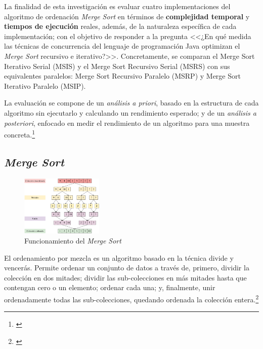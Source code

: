 \documentclass[titlepage]{article}
\begin{document}
La finalidad de esta investigación es evaluar cuatro implementaciones del algoritmo de ordenación \textit{Merge Sort} en términos de \textbf{complejidad temporal} y \textbf{tiempos de ejecución} reales, además, de la naturaleza específica de cada implementación; con el objetivo de responder a la pregunta <<¿En qué medida las técnicas de concurrencia del lenguaje de programación Java optimizan el \textit{Merge Sort} recursivo e iterativo?>>. Concretamente, se comparan el Merge Sort Iterativo Serial (MSIS) y el Merge Sort Recursivo Serial (MSRS) con sus equivalentes paralelos: Merge Sort Recursivo Paralelo (MSRP) y Merge Sort Iterativo Paralelo (MSIP).

La evaluación se compone de un \textit{análisis a priori}, basado en la estructura de cada algoritmo sin ejecutarlo y calculando un rendimiento esperado; y de un \textit{análisis a posteriori}, enfocado en medir el rendimiento de un algoritmo para una muestra concreta.\footnote{\cite{shoolini2025}}

\subsection{\textit{Merge Sort}} %

\begin{figure}
	\vspace{-10pt}
	\centering
	\includegraphics[width=0.35\textwidth]{Diagrames/arbolMS.png}
	\captionsetup{justification=centering}
	\caption{Funcionamiento del \textit{Merge Sort}}
	\label{fig:arbolMS2}
\end{figure}
El ordenamiento por mezcla es un algoritmo basado en la técnica divide y vencerás. Permite ordenar un conjunto de datos a través de, primero, dividir la colección en dos mitades; dividir las sub-colecciones en más mitades hasta que contengan cero o un elemento; ordenar cada una; y, finalmente, unir ordenadamente todas las sub-colecciones, quedando ordenada la colección entera.\footnote{\cite{skiena-2008}}
\end{document}
